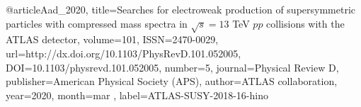 @article{Aad_2020, 
    title={Searches for electroweak production of supersymmetric particles with compressed mass spectra in $\sqrt{s}=13$ TeV $pp$ collisions with the ATLAS detector}, 
    volume={101}, 
    ISSN={2470-0029}, 
    url={http://dx.doi.org/10.1103/PhysRevD.101.052005}, 
    DOI={10.1103/physrevd.101.052005}, 
    number={5}, 
    journal={Physical Review D}, 
    publisher={American Physical Society (APS)}, 
    author={ATLAS collaboration}, 
    year={2020}, 
    month=mar ,
    label={ATLAS-SUSY-2018-16-hino}
}

